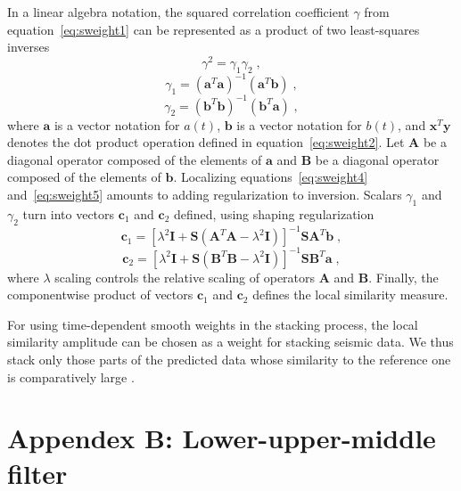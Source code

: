 In a linear algebra notation, the squared correlation coefficient $\gamma$
from equation~\ref{eq:sweight1} can be represented as a product of two
least-squares inverses
\begin{equation}
  \label{eq:sweight3}
     \gamma^2 = \gamma_1 \gamma_2\;,
\end{equation} 
\begin{equation}
  \label{eq:sweight4}
     \gamma_1 = (\mathbf{a}^T \mathbf{a})^{-1}(\mathbf{a}^T \mathbf{b})\;,
\end{equation} 
\begin{equation}
  \label{eq:sweight5}
     \gamma_2 = (\mathbf{b}^T \mathbf{b})^{-1}(\mathbf{b}^T \mathbf{a})\;,
\end{equation} 
where $\mathbf{a}$ is a vector notation for $a(t)$, $\mathbf{b}$ is a
vector notation for $b(t)$, and $\mathbf{x}^T \mathbf{y}$ denotes the
dot product operation defined in equation~\ref{eq:sweight2}. Let
$\mathbf{A}$ be a diagonal operator composed of the elements of
$\mathbf{a}$ and $\mathbf{B}$ be a diagonal operator composed of the
elements of $\mathbf{b}$. Localizing equations~\ref{eq:sweight4}
and~\ref{eq:sweight5} amounts to adding regularization to
inversion. Scalars $\gamma_1$ and $\gamma_2$ turn into vectors
$\mathbf{c}_1$ and $\mathbf{c}_2$ defined, using shaping
regularization \cite[]{Fomel07b}
\begin{equation}
  \label{eq:sweight6}
     \mathbf{c}_1 = [\lambda^2 \mathbf{I} + \mathbf{S}(\mathbf{A}^T \mathbf{A} - \lambda^2 \mathbf{I})]^{-1}\mathbf{S}\mathbf{A}^T\mathbf{b}\;,
\end{equation} 
\begin{equation}
  \label{eq:sweight7}
     \mathbf{c}_2 = [\lambda^2 \mathbf{I} + \mathbf{S}(\mathbf{B}^T \mathbf{B} - \lambda^2 \mathbf{I})]^{-1}\mathbf{S}\mathbf{B}^T\mathbf{a}\;,
\end{equation} 
where $\lambda$ scaling controls the relative scaling of operators
$\mathbf{A}$ and $\mathbf{B}$. Finally, the componentwise product of
vectors $\mathbf{c}_1$ and $\mathbf{c}_2$ defines the local similarity
measure.

For using time-dependent smooth weights in the stacking process, the
local similarity amplitude can be chosen as a weight for stacking
seismic data. We thus stack only those parts of the predicted data whose
similarity to the reference one is comparatively large \cite[]{Liu09b}.

\appendix
\section{Appendex B: Lower-upper-middle filter}

